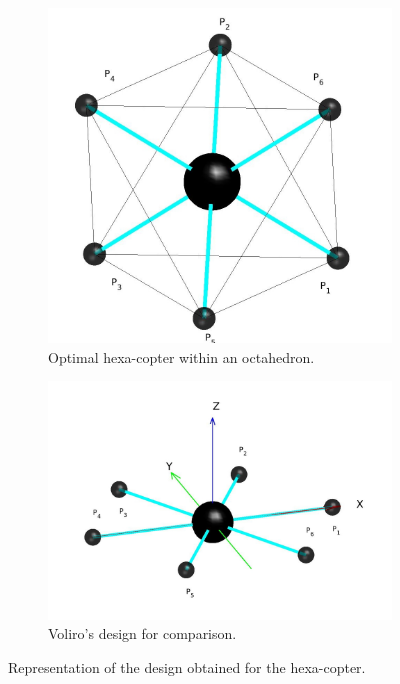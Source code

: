 \begin{figure}[!ht]
{\begin{subfigure}[b]{0.55\textwidth}
    \includegraphics[width=\linewidth]{images/Hexa_octahedron.jpg}
    \caption{Optimal hexa-copter within an octahedron.} \label{fig:Hexacopter_resultb}
  \end{subfigure}
  \hspace*{\fill} %
  \begin{subfigure}[b]{0.8\textwidth}
    \includegraphics[width=\linewidth]{images/Voliro.jpg}
    \caption{Voliro's design for comparison.} \label{fig:Hexacopter_resultc}
  \end{subfigure}}
  \caption{Representation of the design obtained for the hexa-copter.}
  \label{fig:Hexacopter_result}
\end{figure}

